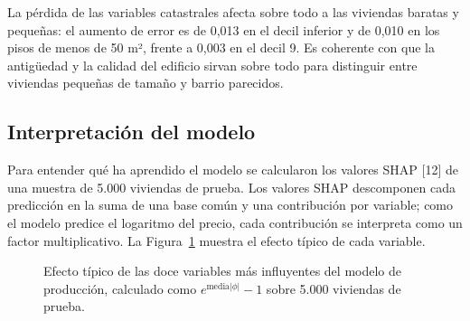 \documentclass[11pt,a4paper]{article}
\begin{document}
La pérdida de las variables catastrales afecta sobre todo a las viviendas baratas y pequeñas: el aumento de error es de 0,013 en el decil inferior y de 0,010 en los pisos de menos de 50 m², frente a 0,003 en el decil 9. Es coherente con que la antigüedad y la calidad del edificio sirvan sobre todo para distinguir entre viviendas pequeñas de tamaño y barrio parecidos.

\subsection{Interpretación del modelo}

Para entender qué ha aprendido el modelo se calcularon los valores SHAP [12] de una muestra de 5.000 viviendas de prueba. Los valores SHAP descomponen cada predicción en la suma de una base común y una contribución por variable; como el modelo predice el logaritmo del precio, cada contribución se interpreta como un factor multiplicativo. La Figura~\ref{fig:shap} muestra el efecto típico de cada variable.

\begin{figure}[!htb]
\centering
{}
\caption{Efecto típico de las doce variables más influyentes del modelo de producción, calculado como $e^{\text{media}|\phi|}-1$ sobre 5.000 viviendas de prueba.}
\label{fig:shap}
\end{figure}
\end{document}
